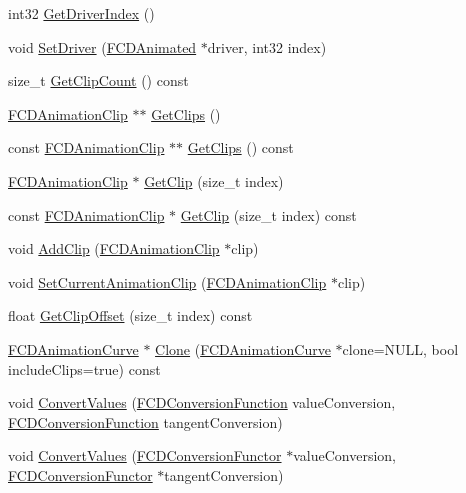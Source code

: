 \begin{DoxyCompactItemize}
\item 
int32 \hyperlink{classFCDAnimationCurve_a5b7178c92b0431345b722f3a41ffc1f8}{GetDriverIndex} ()
\item 
void \hyperlink{classFCDAnimationCurve_aa440afe6b2fa33e6941be2306aa42eb1}{SetDriver} (\hyperlink{classFCDAnimated}{FCDAnimated} $\ast$driver, int32 index)
\item 
size\_\-t \hyperlink{classFCDAnimationCurve_ac84352a4fb7e1bbcabd47652e18e9295}{GetClipCount} () const 
\item 
\hyperlink{classFCDAnimationClip}{FCDAnimationClip} $\ast$$\ast$ \hyperlink{classFCDAnimationCurve_a21949f9cae3491f6e4c9dc3c9218726d}{GetClips} ()
\item 
const \hyperlink{classFCDAnimationClip}{FCDAnimationClip} $\ast$$\ast$ \hyperlink{classFCDAnimationCurve_a08739b03f09ad4e4d72e2b416b3fc0a5}{GetClips} () const 
\item 
\hyperlink{classFCDAnimationClip}{FCDAnimationClip} $\ast$ \hyperlink{classFCDAnimationCurve_ad004f56a3b76bfe41415ed4837326a52}{GetClip} (size\_\-t index)
\item 
const \hyperlink{classFCDAnimationClip}{FCDAnimationClip} $\ast$ \hyperlink{classFCDAnimationCurve_a90d654fc9156705c398f996d56d92b16}{GetClip} (size\_\-t index) const 
\item 
void \hyperlink{classFCDAnimationCurve_af9b490579c37bb15ddee75c415169958}{AddClip} (\hyperlink{classFCDAnimationClip}{FCDAnimationClip} $\ast$clip)
\item 
void \hyperlink{classFCDAnimationCurve_aca5ee7758684615dd5acf659315172c6}{SetCurrentAnimationClip} (\hyperlink{classFCDAnimationClip}{FCDAnimationClip} $\ast$clip)
\item 
float \hyperlink{classFCDAnimationCurve_a931bfe407893568022f461dbb1b3f8e1}{GetClipOffset} (size\_\-t index) const 
\item 
\hyperlink{classFCDAnimationCurve}{FCDAnimationCurve} $\ast$ \hyperlink{classFCDAnimationCurve_a142d97f7ea0f9312b95c2df9337b2356}{Clone} (\hyperlink{classFCDAnimationCurve}{FCDAnimationCurve} $\ast$clone=NULL, bool includeClips=true) const 
\item 
void \hyperlink{classFCDAnimationCurve_abecd157c277b8d1abd0c78b76a97ee83}{ConvertValues} (\hyperlink{FCDAnimationCurve_8h_a3f37db4cc9939d7b076d4cbfe81680c4}{FCDConversionFunction} valueConversion, \hyperlink{FCDAnimationCurve_8h_a3f37db4cc9939d7b076d4cbfe81680c4}{FCDConversionFunction} tangentConversion)
\item 
void \hyperlink{classFCDAnimationCurve_a21defc6b006ae6f3af9810333e8245bc}{ConvertValues} (\hyperlink{classFCDConversionFunctor}{FCDConversionFunctor} $\ast$valueConversion, \hyperlink{classFCDConversionFunctor}{FCDConversionFunctor} $\ast$tangentConversion)

\end{DoxyCompactItemize}
